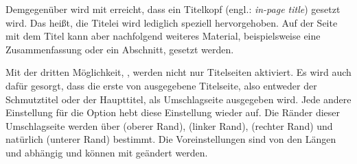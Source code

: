 Demgegenüber wird mit
erreicht, dass ein Titelkopf (engl.: \emph{in-page title}) gesetzt wird. Das
heißt, die Titelei wird lediglich speziell hervorgehoben. Auf der Seite mit
dem Titel kann aber nachfolgend weiteres Material, beispielsweise eine
Zusammenfassung oder ein Abschnitt, gesetzt werden.

Mit%
 der dritten Möglichkeit, %
, werden nicht nur
Titelseiten aktiviert. Es wird auch dafür gesorgt, dass die erste von
 ausgegebene Titelseite,
also entweder der Schmutztitel oder der Haupttitel, als
Umschlagseite ausgegeben wird. Jede andere Einstellung für die
Option  hebt diese Einstellung wieder auf. Die
Ränder dieser Umschlagseite werden
über  (oberer Rand), 
(linker Rand),  (rechter Rand) und natürlich
 (unterer Rand) bestimmt. Die Voreinstellungen
sind von den Längen  und
 abhängig und können mit
 geändert werden.

%
%
\EndIndexGroup


